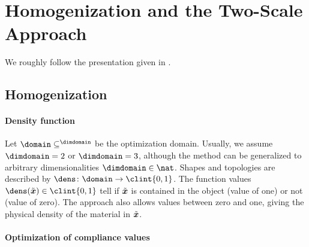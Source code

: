 \section{Homogenization and the Two-Scale Approach}
\label{sec:61homogenization}

We roughly follow the presentation given in
.



\subsection{Homogenization}
\label{sec:611homogenization}

\paragraph{Density function}

Let $\domain \subset \real^{\dimdomain}$ be the optimization domain.
Usually, we assume $\dimdomain = 2$ or $\dimdomain = 3$,
although the method can be generalized to
arbitrary dimensionalities $\dimdomain \in \nat$.
Shapes and topologies are described by 
$\dens\colon \domain \to \clint{0, 1}$.
The function values $\dens(\tilde{\*x}) \in \clint{0, 1}$ tell if $\tilde{{\boldsymbol{x}}}$
is contained in the object (value of one) or not (value of zero).
The  approach also allows values between
zero and one, giving the physical density of the material in $\tilde{{\boldsymbol{x}}}$.

\paragraph{Optimization of compliance values}

